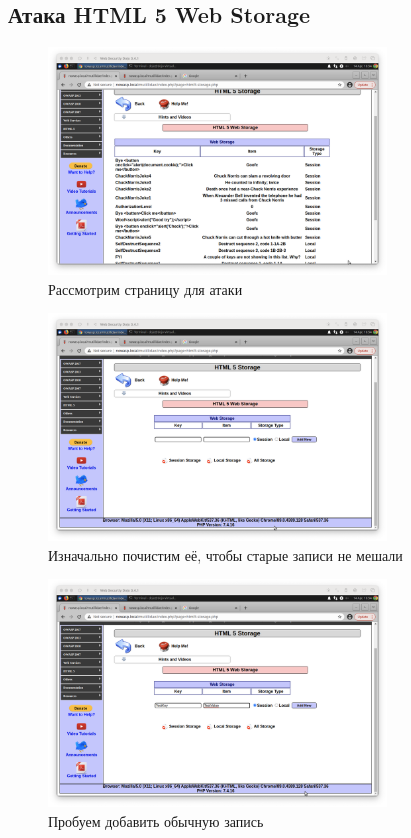 \documentclass[a4paper]{article}
\begin{document}
  \subsection{Атака HTML 5 Web Storage}

  \begin{figure}[H]
    \centering
    \includegraphics[width=0.8\textwidth]{step_00032}
    \caption{Рассмотрим страницу для атаки}
  \end{figure}

  \begin{figure}[H]
    \centering
    \includegraphics[width=0.8\textwidth]{step_00033}
    \caption{Изначально почистим её, чтобы старые записи не мешали}
  \end{figure}

  \begin{figure}[H]
    \centering
    \includegraphics[width=0.8\textwidth]{step_00034}
    \caption{Пробуем добавить обычную запись}
  \end{figure}
\end{document}
